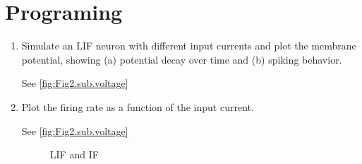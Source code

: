 \documentclass[11pt]{article}
\begin{document}
\begin{enumerate}
	\end{enumerate}
	
	\section*{Programing}
	\begin{enumerate}
		\item Simulate an LIF neuron with different input currents and plot the membrane potential, showing (a) potential decay over time and (b) spiking behavior.

		See \ref{fig:Fig2.sub.voltage}
		
		\item Plot the firing rate as a function of the input current.
		
		See \ref{fig:Fig2.sub.voltage}
		
		\begin{figure}[ht]
			\centering
			\caption{LIF and IF}
		\end{figure}
		

\end{enumerate}
\end{document}
